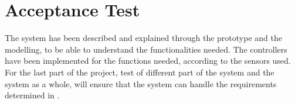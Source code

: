\chapter{Acceptance Test}\label{cha:AcceptTest}

The system has been described and explained through the prototype and the modelling, to be able to understand the functionalities needed. The controllers have been implemented for the functions needed, according to the sensors used. For the last part of the project, test of  different part of the system and the system as a whole, will ensure that the system can handle the requirements determined in .